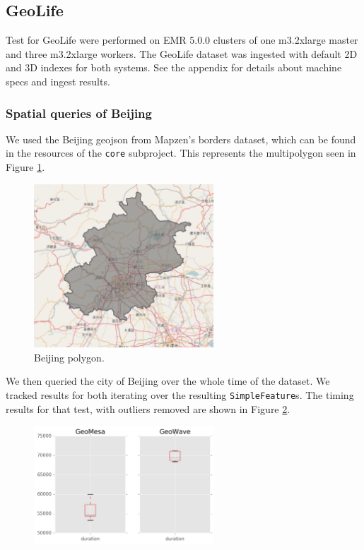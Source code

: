 \subsection{ GeoLife}

Test for GeoLife were performed on EMR 5.0.0 clusters of one m3.2xlarge master and three m3.2xlarge workers.
The GeoLife dataset was ingested with default 2D and 3D indexes for both systems.
See the appendix for details about machine specs and ingest results.

\subsubsection{Spatial queries of Beijing}

We used the Beijing geojson from Mapzen's borders dataset, which can be found in the resources of the \texttt{core} subproject.
This represents the multipolygon seen in Figure \ref{beijingpolygon}.

\begin{figure}[h!tb]
  \centering
  \includegraphics[width=0.60\textwidth]{../docs/img/beijing-poly.png}
  \caption{Beijing polygon.}
  \label{beijingpolygon}
\end{figure}

We then queried the city of Beijing over the whole time of the dataset.
We tracked results for both iterating over the resulting \texttt{SimpleFeature}s.
The timing results for that test, with outliers removed are shown in Figure \ref{beijingiterate}.

\begin{figure}[h!tb]
  \centering
  \includegraphics[width=0.60\textwidth]{../docs/img/geolife-beijing-iterate.png}
  \label{beijingiterate}
\end{figure}

